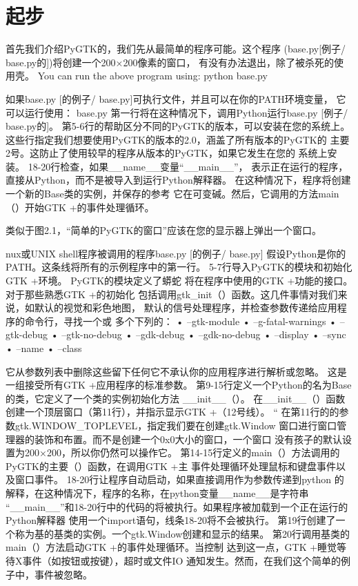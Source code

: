 \chapter{起步}
首先我们介绍PyGTK的，我们先从最简单的程序可能。这个程序
(base.py[例子/ base.py的])将创建一个200×200像素的窗口，
有没有办法退出，除了被杀死的使用壳。
You can run the above program using:
python base.py

如果base.py [的例子/ base.py]可执行文件，并且可以在你的PATH环境变量，
它可以运行使用：
base.py
第一行将在这种情况下，调用Python运行base.py [例子/ base.py的]。
第5-6行的帮助区分不同的PyGTK的版本，可以安装在您的系统上。
这些行指定我们想要使用PyGTK的版本的2.0，涵盖了所有版本的PyGTK的
主要2号。这防止了使用较早的程序从版本的PyGTK，如果它发生在您的
系统上安装。 18-20行检查，如果\_\_name\_\_变量“\_\_main\_\_”，
表示正在运行的程序，直接从Python，而不是被导入到运行Python解释器。
在这种情况下，程序将创建一个新的Base类的实例，并保存的参考
它在可变碱。然后，它调用的方法main（）开始GTK +的事件处理循环。


类似于图2.1，“简单的PyGTK的窗口”应该在您的显示器上弹出一个窗口。	


nux或UNIX shell程序被调用的程序base.py [的例子/ base.py]
假设Python是你的PATH。这条线将所有的示例程序中的第一行。
5-7行导入PyGTK的模块和初始化GTK +环境。 PyGTK的模块定义了蟒蛇
将在程序中使用的GTK +功能的接口。对于那些熟悉GTK +的初始化
包括调用gtk\_init（）函数。这几件事情对我们来说，如默认的视觉和彩色地图，
默认的信号处理程序，并检查参数传递给应用程序的命令行，寻找一个或
多个下列的：
• --gtk-module
• --g-fatal-warnings
• --gtk-debug
• --gtk-no-debug
• --gdk-debug
• --gdk-no-debug
• --display
• --sync
• --name
• --class

它从参数列表中删除这些留下任何它不承认你的应用程序进行解析或忽略。
这是一组接受所有GTK +应用程序的标准参数。
第9-15行定义一个Python的名为Base的类，它定义了一个类的实例初始化方法
\_\_init\_\_（）。
在\_\_init\_\_（）函数创建一个顶层窗口（第11行），并指示显示GTK +（12号线）。 “
在第11行的的参数gtk.WINDOW\_TOPLEVEL，指定我们要在创建gtk.Window
窗口进行窗口管理器的装饰和布置。而不是创建一个0x0大小的窗口，一个窗口
没有孩子的默认设置为200×200，所以你仍然可以操作它。
第14-15行定义的main（）方法调用的PyGTK的主要（）函数，在调用GTK +主
事件处理循环处理鼠标和键盘事件以及窗口事件。
18-20行让程序自动启动，如果直接调用作为参数传递到python
的解释，在这种情况下，程序的名称，在python变量\_\_name\_\_是字符串
“\_\_main\_\_”和18-20行中的代码的将被执行。如果程序被加载到一个正在运行的Python解释器
使用一个import语句，线条18-20将不会被执行。
第19行创建了一个称为基的基类的实例。一个gtk.Window创建和显示的结果。
第20行调用基类的main（）方法启动GTK +的事件处理循环。当控制
达到这一点，GTK +睡觉等待X事件（如按钮或按键），超时或文件IO
通知发生。然而，在我们这个简单的例子中，事件被忽略。	

